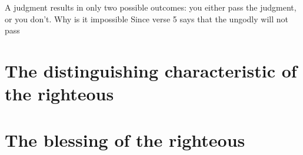 \documentclass[a5paper]{book}
\begin{document}
A judgment results in only two possible outcomes:
    you either pass the judgment, or you don't.
Why is it impossible 
Since verse 5 says that the ungodly will not pass
\section{The distinguishing characteristic of the righteous}
\section{The blessing of the righteous}
\end{document}
